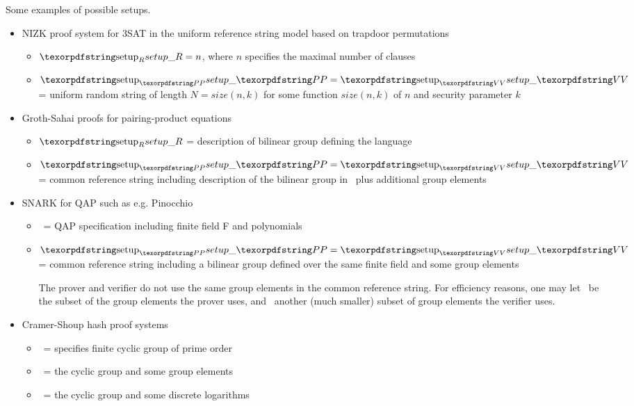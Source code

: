 Some examples of possible setups.
\begin{itemize}

\item NIZK proof system for 3SAT in the uniform reference string model based on trapdoor permutations
		\begin{itemize}
		\item $\setR = n$, where $n$ specifies the maximal number of clauses
		\item $\setP = \setV$ = uniform random string of length $N = size(n,k)$ for some function $size(n,k)$ of $n$ and security parameter $k$
		\end{itemize}

\item Groth-Sahai proofs for pairing-product equations
	\begin{itemize}
	\item $\setR$ = description of bilinear group defining the language
	\item $\setP = \setV$ = common reference string including description of the bilinear group in \setR\ plus additional group elements
	\end{itemize}

\item SNARK for QAP such as e.g. Pinocchio
	\begin{itemize}
	\item \setR\ = QAP specification including finite field F and polynomials
	\item $\setP = \setV$ = common reference string including a bilinear group defined over the same finite field and some group elements

The prover and verifier do not use the same group elements in the common reference string. For efficiency reasons, one may let \setP\ be the subset of the group elements the prover uses, and \setV\ another (much smaller) subset of group elements the verifier uses.\loosen
	\end{itemize}

\item Cramer-Shoup hash proof systems
	\begin{itemize}
	\item \setR\ = specifies finite cyclic group of prime order
	\item \setP\ = the cyclic group and some group elements
	\item \setV\ = the cyclic group and some discrete logarithms
	\end{itemize}

\end{itemize}


